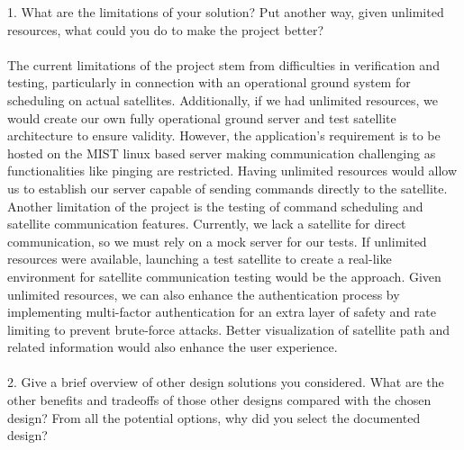\documentclass[12pt, titlepage]{article}
\begin{document}
1. What are the limitations of your solution? Put another way, given unlimited resources, what could you do to make the project better?
\\
\\
The current limitations of the project stem from difficulties in verification and testing, particularly in connection with an operational ground system for scheduling on actual satellites. Additionally, if we had unlimited resources, we would create our own fully operational ground server and test satellite architecture to ensure validity. However, the application's requirement is to be hosted on the MIST linux based server making communication challenging as functionalities like pinging are restricted. Having unlimited resources would allow us to establish our server capable of sending commands directly to the satellite. Another limitation of the project is the testing of command scheduling and satellite communication features. Currently, we lack a satellite for direct communication, so we must rely on a mock server for our tests. If unlimited resources were available, launching a test satellite to create a real-like environment for satellite communication testing would be the approach. Given unlimited resources, we can also enhance the authentication process by implementing multi-factor authentication for an extra layer of safety and rate limiting to prevent brute-force attacks. Better visualization of satellite path and related information would also enhance the user experience. 
\\
\\
2. Give a brief overview of other design solutions you considered. What are the other benefits and tradeoffs of those other designs compared with the chosen design? From all the potential options, why did you select the documented design?
\\
\end{document}
